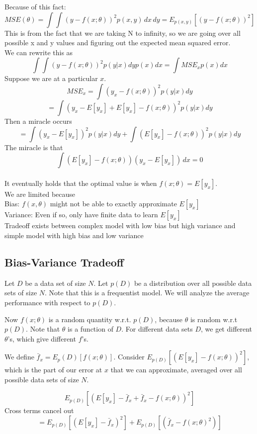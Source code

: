 \documentclass[11pt,psfig]{article}
\begin{document}
Because of this fact:
\[
MSE(\theta) = \int{\int{(y-f(x;\theta))^2 p(x,y)\,dx}\,dy} = E_{p(x,y)}[(y-f(x;\theta))^2]
\]
This is from the fact that we are taking N to infinity, so we are going over all possible x and y values and figuring out the expected mean squared error. \\
We can rewrite this as
\[
\int{ \int{ (y-f(x;\theta))^2 p(y|x)dy} p(x)dx } = \int{ MSE_x p(x)dx }
\]
Suppose we are at a particular $x$.
\[
MSE_x = \int (y_x - f(x; \theta))^2 p(y|x) dy
\]
\[
= \int (y_x - E[y_x] + E[y_x] - f(x; \theta))^2 p(y|x) dy
\]
Then a miracle occurs
\[
= \int (y_x - E[y_x])^2 p(y|x) dy + \int (E[y_x] - f(x; \theta))^2 p(y|x) dy
\]
The miracle is that
\[
\int{(E[y_x] - f(x;\theta))(y_x - E[y_x])\,dx} = 0
\]
\\
It eventually holds that the optimal value is when $f(x;\theta)=E[y_x]$. \\
We are limited because\\
Bias: $f(x,\theta)$ might not be able to exactly approximate $E[y_x]$\\
Variance: Even if so, only have finite data to learn $E[y_x]$\\
Tradeoff exists between complex model with low bias but high variance and \\
simple model with high bias and low variance

\subsection*{Bias-Variance Tradeoff}
Let $D$ be a data set of size $N$. Let $p(D)$ be a distribution over all possible data sets of size $N$. Note that this is a frequentist model. We will analyze the average performance with respect to $p(D)$.

Now $f(x; \theta)$ is a random quantity w.r.t. $p(D)$, because $\theta$ is random w.r.t $p(D)$. Note that $\theta$ is a function of $D$. For different data sets $D$, we get different $\theta$'s, which give different $f$'s.

We define $\bar{f}_x = E_p(D)[f(x; \theta)]$. \newline
Consider $E_{p(D)}[(E[y_x] - f(x; \theta))^2]$, which is the part of our error at $x$ that we can approximate, averaged over all possible data sets of size $N$.

\[
E_{p(D)}[(E[y_x] - \bar{f}_x + \bar{f}_x - f(x; \theta))^2]
\]
Cross terms cancel out
\[
= E_{p(D)}[(E[y_x] - \bar{f}_x)^2] + E_{p(D)}[(\bar{f}_x - f(x; \theta)^2)]
\]
\end{document}
